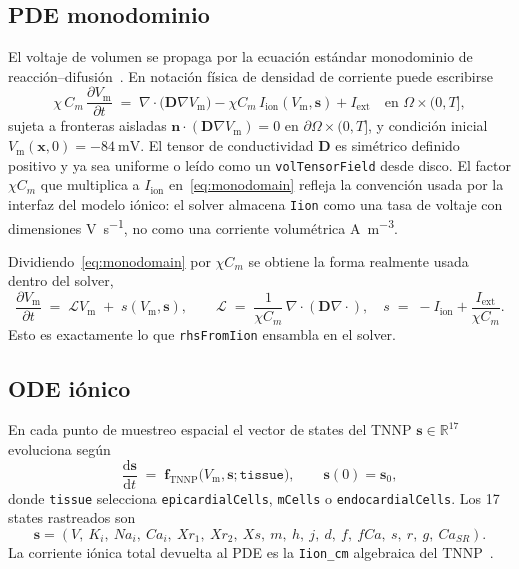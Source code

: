 \documentclass[11pt,a4paper]{article}
\newcommand{\code}[1]{\texttt{\small #1}}
\newcommand{\Vm}{V_{\text{m}}}
\newcommand{\Iion}{I_{\mathrm{ion}}}
\newcommand{\Dten}{\mathbf{D}}
\newcommand{\grad}{\nabla}
\newcommand{\divg}{\nabla\!\cdot}
\newcommand{\R}{\mathbb{R}}
\newcommand{\Iext}{I_{\mathrm{ext}}}
\begin{document}
\subsection{PDE monodominio}

El voltaje de volumen se propaga por la ecuación estándar monodominio de
reacción--difusión~\cite{ttp2004,niederer2012}. En notación física de densidad de
corriente puede escribirse
\begin{equation}
  \chi \, C_{m} \, \frac{\partial \Vm}{\partial t}
   \;=\;
   \divg\!\bigl( \Dten \grad \Vm \bigr)
   - \chi C_m\,\Iion(\Vm, \mathbf{s})
   + \Iext
   \quad \text{en } \Omega \times (0, T],
   \label{eq:monodomain}
\end{equation}
sujeta a fronteras aisladas
$\mathbf{n} \cdot ( \Dten \grad \Vm ) = 0$ en
$\partial \Omega \times (0, T]$, y condición inicial
$\Vm(\mathbf{x}, 0) = -\SI{84}{\milli\volt}$. El tensor de conductividad
$\Dten$ es simétrico definido positivo y ya sea uniforme o leído como un
\code{volTensorField} desde disco. El factor $\chi C_m$ que multiplica a
$\Iion$ en~\eqref{eq:monodomain} refleja la convención usada por la interfaz del
modelo iónico: el solver almacena \code{Iion} como una tasa de voltaje con
dimensiones \si{\volt\per\second}, no como una corriente volumétrica
\si{\ampere\per\meter\cubed}.

Dividiendo~\eqref{eq:monodomain} por $\chi C_{m}$ se obtiene la forma realmente
usada dentro del solver,
\begin{equation}
  \frac{\partial \Vm}{\partial t}
   \;=\;
   \mathcal{L} \Vm
   \;+\;
   s(\Vm, \mathbf{s}),
   \qquad
   \mathcal{L} \;=\; \frac{1}{\chi C_{m}}\,\divg(\Dten \grad \cdot),
   \quad
   s \;=\; -\Iion + \frac{\Iext}{\chi C_{m}}.
   \label{eq:semi-discrete}
\end{equation}
Esto es exactamente lo que \code{rhsFromIion} ensambla en el solver.

\subsection{ODE iónico}

En cada punto de muestreo espacial el vector de states del TNNP
$\mathbf{s} \in \R^{17}$ evoluciona según
\begin{equation}
  \frac{\mathrm{d}\mathbf{s}}{\mathrm{d}t}
   \;=\;
   \mathbf{f}_{\text{TNNP}}\!\bigl(\Vm, \mathbf{s}; \texttt{tissue}\bigr),
   \qquad \mathbf{s}(0) = \mathbf{s}_{0},
   \label{eq:tnnp}
\end{equation}
donde \code{tissue} selecciona \code{epicardialCells}, \code{mCells} o
\code{endocardialCells}. Los 17 states rastreados son
\[
  \mathbf{s} = (V,\ K_{i},\ Na_{i},\ Ca_{i},\ Xr_{1},\ Xr_{2},\ Xs,\ m,\ h,\ j,\ d,\ f,\ fCa,\ s,\ r,\ g,\ Ca_{SR}).
\]
La corriente iónica total devuelta al PDE es la \code{Iion\_cm} algebraica del
TNNP~\cite{ttp2004}.
\end{document}
